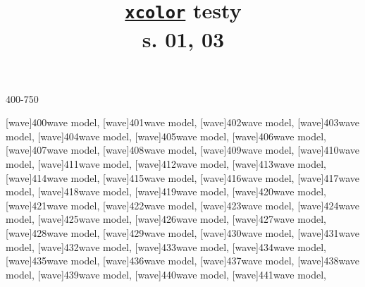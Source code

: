 \documentclass[a4paper,11pt]{article}
\title{\href{https://repo.skni.umcs.pl/ctan/macros/latex/contrib/xcolor/xcolor.pdf}{\texttt{xcolor}} testy \\
  s. 01, 03}
\author{}
\begin{document}





\maketitle %



400-750

\noindent
{}[wave]{400}{wave model},
[wave]{401}{wave model},
[wave]{402}{wave model},
[wave]{403}{wave model},
[wave]{404}{wave model},
[wave]{405}{wave model},
[wave]{406}{wave model}, \\[0.7em]
[wave]{407}{wave model},
[wave]{408}{wave model},
[wave]{409}{wave model},
[wave]{410}{wave model},
[wave]{411}{wave model},
[wave]{412}{wave model},
[wave]{413}{wave model}, \\[0.7em]
[wave]{414}{wave model},
[wave]{415}{wave model},
[wave]{416}{wave model},
[wave]{417}{wave model},
[wave]{418}{wave model},
[wave]{419}{wave model},
[wave]{420}{wave model}, \\[0.7em]
[wave]{421}{wave model},
[wave]{422}{wave model},
[wave]{423}{wave model},
[wave]{424}{wave model},
[wave]{425}{wave model},
[wave]{426}{wave model},
[wave]{427}{wave model}, \\[0.7em]
[wave]{428}{wave model},
[wave]{429}{wave model},
[wave]{430}{wave model},
[wave]{431}{wave model},
[wave]{432}{wave model},
[wave]{433}{wave model},
[wave]{434}{wave model}, \\[0.7em]
[wave]{435}{wave model},
[wave]{436}{wave model},
[wave]{437}{wave model},
[wave]{438}{wave model},
[wave]{439}{wave model},
[wave]{440}{wave model},
[wave]{441}{wave model}, \\[0.7em]
\end{document}
